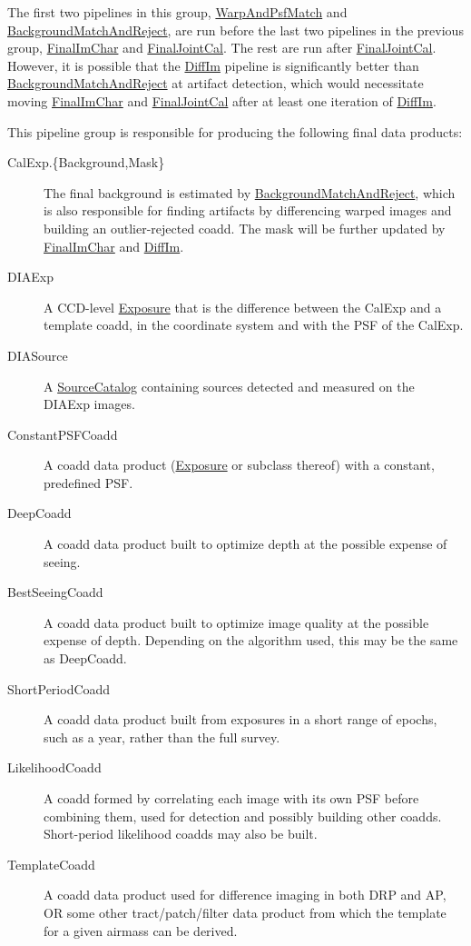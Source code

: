 The first two pipelines in this group, \hyperref[sec:drpWarpAndPsfMatch]{WarpAndPsfMatch} and \hyperref[sec:drpBackgroundMatchAndReject]{BackgroundMatchAndReject}, are run before the last two pipelines in the previous group, \hyperref[sec:drpFinalImChar]{FinalImChar} and \hyperref[sec:drpFinalJointCal]{FinalJointCal}.  The rest are run after \hyperref[sec:drpFinalJointCal]{FinalJointCal}.  However, it is possible that the \hyperref[sec:drpDiffIm]{DiffIm} pipeline is significantly better than \hyperref[sec:drpBackgroundMatchAndReject]{BackgroundMatchAndReject} at artifact detection, which would necessitate moving \hyperref[sec:drpFinalImChar]{FinalImChar} and \hyperref[sec:drpFinalJointCal]{FinalJointCal} after at least one iteration of \hyperref[sec:drpDiffIm]{DiffIm}.

This pipeline group is responsible for producing the following final data products:
\begin{description}
\item[CalExp.\{Background,Mask\}]  The final background is estimated by \hyperref[sec:drpBackgroundMatchAndReject]{BackgroundMatchAndReject}, which is also responsible for finding artifacts by differencing warped images and building an outlier-rejected coadd.  The mask will be further updated by \hyperref[sec:drpFinalImChar]{FinalImChar} and \hyperref[sec:drpDiffIm]{DiffIm}.
\item[DIAExp] A CCD-level \hyperref[sec:spImagesExposure]{Exposure} that is the difference between the CalExp and a template coadd, in the coordinate system and with the PSF of the CalExp.
\item[DIASource] A \hyperref[sec:spTablesSource]{SourceCatalog} containing sources detected and measured on the DIAExp images.
\item[ConstantPSFCoadd] A coadd data product (\hyperref[sec:spImagesExposure]{Exposure} or subclass thereof) with a constant, predefined PSF.
\item[DeepCoadd] A coadd data product built to optimize depth at the possible expense of seeing.
\item[BestSeeingCoadd] A coadd data product built to optimize image quality at the possible expense of depth.  Depending on the algorithm used, this may be the same as DeepCoadd.
\item[ShortPeriodCoadd] A coadd data product built from exposures in a short range of epochs, such as a year, rather than the full survey.
\item[LikelihoodCoadd] A coadd formed by correlating each image with its own PSF before combining them, used for detection and possibly building other coadds.  Short-period likelihood coadds may also be built.
\item[TemplateCoadd] A coadd data product used for difference imaging in both DRP and AP, OR some other tract/patch/filter data product from which the template for a given airmass can be derived.
\end{description}

